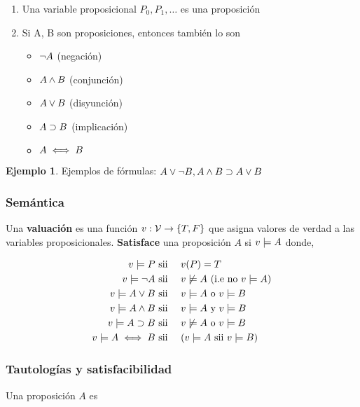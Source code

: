 \documentclass{report}
\theoremstyle{definition} %
\newtheorem*{example*}{Ejemplo}
\newcommand{\tfunc}[2]{#1 \to #2}
\begin{document}
\begin{enumerate}
    \item Una variable proposicional $P_0, P_1, \dots$ es una proposición
    \item Si A, B son proposiciones, entonces también lo son
    \begin{itemize}
        \item $\neg A$ (negación)
        \item $A \wedge B$ (conjunción)
        \item $A \vee B$ (disyunción)
        \item $A \supset B$ (implicación)
        \item $A \iff B$
    \end{itemize}

\end{enumerate}
\begin{example*}
    Ejemplos de fórmulas: 
    $A \vee \neg B, A \wedge B \supset A \vee B$
\end{example*}

\subsubsection{Semántica}

Una \textbf{valuación} es una función $v: \tfunc{\propVars}{\{ T, F \}}$ que
asigna valores de verdad a las variables proposicionales. \textbf{Satisface} una
proposición $A$ si $v \models A$ donde,

\begin{alignat*}{2}
    v \models P & \text{ sii } && v(P) = T\\
    v \models \neg A & \text{ sii }&& v \not\models A \text{ (i.e no $v \models A$)}\\
    v \models A \vee B & \text{ sii }&& v \models A \text{ o } v \models B\\
    v \models A \wedge B & \text{ sii }&& v \models A \text{ y } v \models B\\
    v \models A \supset B &\text{ sii }&& v \not\models A \text{ o } v \models B\\
    v \models A \iff B & \text{ sii }&& (v \models A \text{ sii } v \models B)
\end{alignat*}

\subsubsection{Tautologías y satisfacibilidad}

Una proposición $A$ es
\end{document}
